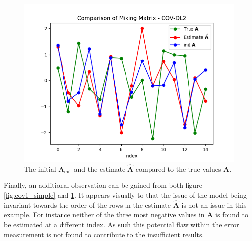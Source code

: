 \begin{figure}[H]
\centering
\includegraphics[scale=0.5]{figures/ch_6/COV2_simple.png}
\caption{The initial $\mathbf{A}_{\text{init}}$ and the estimate $\hat{\mathbf{A}}$ compared to the true values $\mathbf{A}$.}
\label{fig:cov2_simple}
\end{figure}

\noindent
Finally, an additional observation can be gained from both figure \ref{fig:cov1_simple} and \ref{fig:cov2_simple}. 
It appears visually to that the issue of the model being invariant towards the order of the rows in the estimate $\hat{\mathbf{A}}$ is not an issue in this example. 
For instance neither of the three most negative values in $\mathbf{A}$ is found to be estimated at a different index. 
As such this potential flaw within the error measurement is not found to contribute to the insufficient results. 


